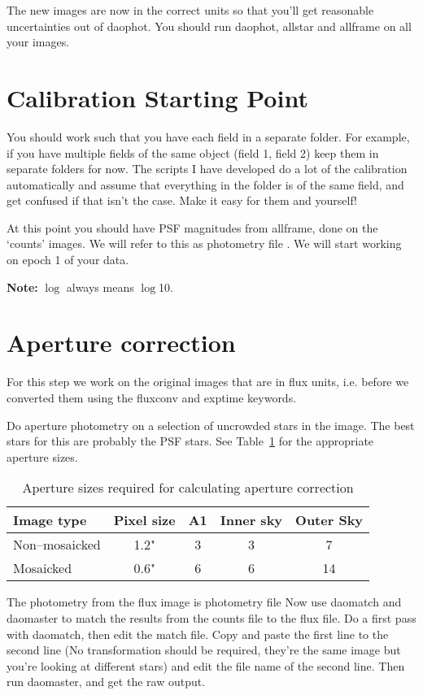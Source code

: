 \documentclass[11pt]{article}
\newcommand*\circled[1]{\tikz[baseline=(char.base)]{
            \node[shape=circle,draw,inner sep=2pt] (char) {#1};}}
\begin{document}
The new images are now in the correct units so that you'll get reasonable uncertainties out of daophot. You should run daophot, allstar and allframe on all your images. 

\section{Calibration Starting Point}
\label{start}

You should work such that you have each field in a separate folder. For example, if you have multiple fields of the same object (field 1, field 2) keep them in separate folders for now. The scripts I have developed do a lot of the calibration automatically and assume that everything in the folder is of the same field, and get confused if that isn't the case. Make it easy for them and yourself!

At this point you should have PSF magnitudes from allframe, done on the `counts' images. We will refer to this as photometry file \circled{1}. We will start working on epoch 1 of your data.

\textbf{Note:} $\log$ always means $\log$10.


\section{Aperture correction}
\label{sec:apcor}
For this step we work on the original images that are in flux units, i.e. before we converted them using the fluxconv and exptime keywords. 

Do aperture photometry on a selection of uncrowded stars in the image. The best stars for this are probably the PSF stars. See Table~\ref{tab:apertures} for the appropriate aperture sizes.

\begin{table}
\begin{center}
\begin{tabular}{l c c c c} \hline
Image type & Pixel size & A1 & Inner sky  & Outer Sky   \\ \hline \hline
Non--mosaicked & 1.2" & 3 & 3 & 7 \\
Mosaicked & 0.6" & 6 & 6 & 14 \\ 
\hline
\end{tabular}
\caption{Aperture sizes required for calculating aperture correction}
\label{tab:apertures}
\end{center}
\end{table}

The photometry from the flux image is photometry file \circled{2}
Now use daomatch and daomaster to match the results from the counts file to the flux file. Do a first pass with daomatch, then edit the match file. Copy and paste the first line to the second line (No transformation should be required, they're the same image but you're looking at different stars) and edit the file name of the second line. Then run daomaster, and get the raw output.
\end{document}
